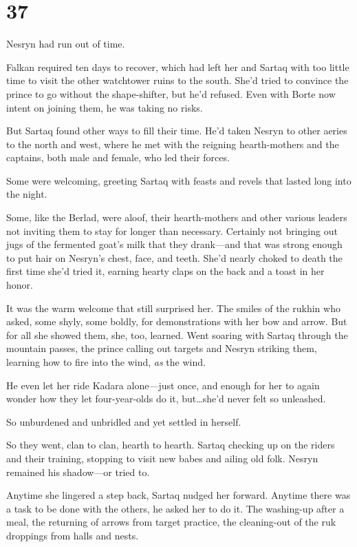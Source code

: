 
\chapter{37}

Nesryn had run out of time.

Falkan required ten days to recover, which had left her and Sartaq with too little time to visit the other watchtower ruins to the south.
She'd tried to convince the prince to go without the shape-shifter, but he'd refused.
Even with Borte now intent on joining them, he was taking no risks.

But Sartaq found other ways to fill their time.
He'd taken Nesryn to other aeries to the north and west, where he met with the reigning hearth-mothers and the captains, both male and female, who led their forces.

Some were welcoming, greeting Sartaq with feasts and revels that lasted long into the night.

Some, like the Berlad, were aloof, their hearth-mothers and other various leaders not inviting them to stay for longer than necessary.
Certainly not bringing out jugs of the fermented goat's milk that they drank---and that was strong enough to put hair on Nesryn's chest, face, and teeth.
She'd nearly choked to death the first time she'd tried it, earning hearty claps on the back and a toast in her honor.

It was the warm welcome that still surprised her.
The smiles of the rukhin who asked, some shyly, some boldly, for demonstrations with her bow and arrow.
But for all she showed them, she, too, learned.
Went soaring with Sartaq through the mountain passes, the prince calling out targets and Nesryn striking them, learning how to fire into the wind,
\emph{as} the wind.

He even let her ride Kadara alone---just once, and enough for her to again wonder how they let four-year-olds do it, but\ldots she'd never felt so unleashed.

So unburdened and unbridled and yet settled in herself.

So they went, clan to clan, hearth to hearth.
Sartaq checking up on the riders and their training, stopping to visit new babes and ailing old folk.
Nesryn remained his shadow---or tried to.

Anytime she lingered a step back, Sartaq nudged her forward.
Anytime there was a task to be done with the others, he asked her to do it.
The washing-up after a meal, the returning of arrows from target practice, the cleaning-out of the ruk droppings from halls and nests.

